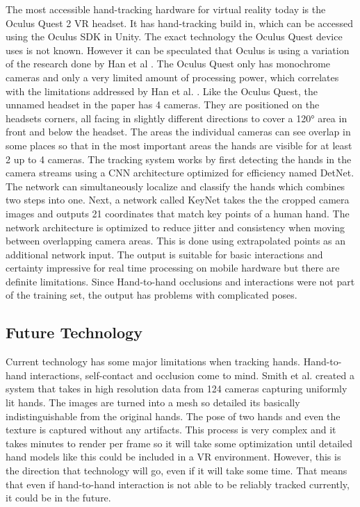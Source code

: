 The most accessible hand-tracking hardware for virtual reality today is
the Oculus Quest 2 VR headset. It has hand-tracking build in, which can
be accessed using the Oculus SDK in Unity. The exact technology the
Oculus Quest device uses is not known. However it can be speculated that
Oculus is using a variation of the research done by Han et al \cite{Han}. The
Oculus Quest only has monochrome cameras and only a very limited amount
of processing power, which correlates with the limitations addressed by
Han et al. \cite{Han}. Like the Oculus Quest, the
unnamed headset in the paper has 4 cameras. They are positioned on the
headsets corners, all facing in slightly different directions to cover a
120° area in front and below the headset. The areas the individual
cameras can see overlap in some places so that in the most important
areas the hands are visible for at least 2 up to 4 cameras. The
tracking system works by first detecting the hands in the camera streams
using a CNN architecture optimized for efficiency named DetNet. The
network can simultaneously localize and classify the hands which
combines two steps into one. Next, a network called KeyNet takes the the
cropped camera images and outputs 21 coordinates that match key points
of a human hand. The network architecture is optimized to reduce jitter
and consistency when moving between overlapping camera areas. This is
done using extrapolated points as an additional network input. The
output is suitable for basic interactions and certainty impressive for
real time processing on mobile hardware but there are definite
limitations. Since Hand-to-hand occlusions and interactions were not
part of the training set, the output has problems with complicated
poses.


\subsection{Future Technology}\label{future-technology}

Current technology has some major limitations when tracking hands.
Hand-to-hand interactions, self-contact and occlusion come to mind.
Smith et al. \cite{Smith} created a system that takes in high resolution data from
124 cameras capturing uniformly lit hands. The images are turned into a
mesh so detailed its basically indistinguishable from the original
hands. The pose of two hands and even the texture is captured without
any artifacts. This process is very complex and it takes minutes to
render per frame so it will take some optimization until detailed hand
models like this could be included in a VR environment. However, this is
the direction that technology will go, even if it will take some time.
That means that even if hand-to-hand interaction is not able to be
reliably tracked currently, it could be in the future.

